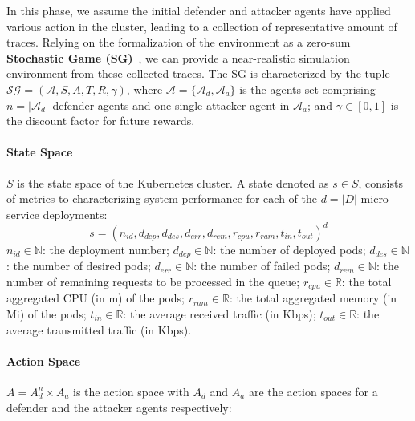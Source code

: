 In this phase, we assume the initial defender and attacker agents have applied various action in the cluster, leading to a collection of representative amount of traces. Relying on the formalization of the environment as a zero-sum \textbf{Stochastic Game (SG)}~\cite{shapley1953stochastic}, we can provide a near-realistic simulation environment from these collected traces. The SG is characterized by the tuple $\mathcal{SG} = (\mathcal{A}, S, A, T, R, \gamma)$, where $\mathcal{A} = \{\mathcal{A}_d, \mathcal{A}_a\}$ is the agents set comprising $n = |\mathcal{A}_d|$ defender agents and one single attacker agent in $\mathcal{A}_a$; and $\gamma \in [0, 1]$ is the discount factor for future rewards.

\noindent \paragraph{\textbf{State Space}} $S$ is the state space of the Kubernetes cluster. A state denoted as $s \in S$, consists of metrics to characterizing system performance for each of the $d = |D|$ micro-service deployments:
$$
s = (n_{id}, d_{dep}, d_{des}, d_{err}, d_{rem}, r_{cpu}, r_{ram}, t_{in}, t_{out})^d
$$
$n_{id} \in \mathbb{N}$: the deployment number; \quad
$d_{dep} \in \mathbb{N}$: the number of deployed pods; \quad 
$d_{des} \in \mathbb{N}$: the number of desired pods; \quad
$d_{err} \in \mathbb{N}$: the number of failed pods; \quad
$d_{rem} \in \mathbb{N}$: the number of remaining requests to be processed in the queue; \quad
$r_{cpu} \in \mathbb{R}$: the total aggregated CPU (in m) of the pods; \quad
$r_{ram} \in \mathbb{R}$: the total aggregated memory (in Mi) of the pods; \quad
$t_{in} \in \mathbb{R}$: the average received traffic (in Kbps); \quad
$t_{out} \in \mathbb{R}$: the average transmitted traffic (in Kbps).


\noindent \paragraph{\textbf{Action Space}} $A = A_d^n \times A_a$ is the action space with $A_d$ and $A_a$ are the action spaces for a defender and the attacker agents respectively:

